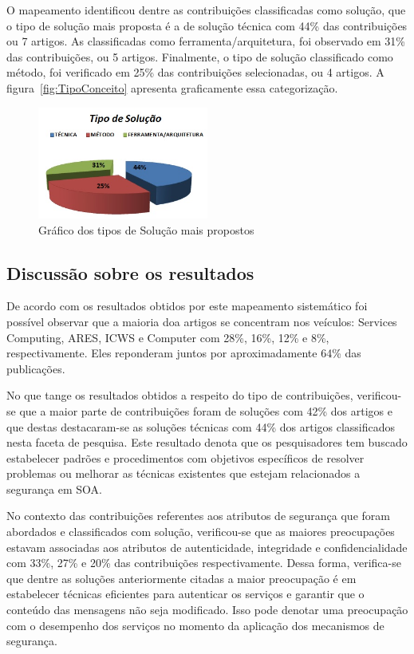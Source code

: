O mapeamento identificou dentre as contribuições classificadas como solução, que o tipo de solução mais proposta é a de solução técnica com 44\% das contribuições ou 7 artigos. As classificadas como ferramenta/arquitetura, foi observado em 31\% das contribuições, ou 5 artigos. Finalmente, o tipo de solução classificado como método, foi verificado em 25\% das contribuições selecionadas, ou 4 artigos. A figura~\ref{fig:TipoConceito} apresenta graficamente essa categorização.


\begin{figure}[!htb]
\centering
\includegraphics[width=0.5\textwidth]{tipo_solucao.jpg}
\caption{Gráfico dos tipos de Solução mais propostos}
\label{fig:tipo_solucao}
\end{figure}
\subsection{Discussão sobre os resultados}

De acordo com os resultados obtidos por este mapeamento sistemático foi possível observar que a maioria doa artigos se concentram nos veículos: Services Computing, ARES, ICWS e Computer com 28\%, 16\%, 12\% e 8\%, respectivamente. Eles reponderam juntos por aproximadamente 64\% das publicações.

No que tange os resultados obtidos a respeito do tipo de contribuições, verificou-se que a maior parte de contribuições foram de soluções com  42\% dos artigos e que destas destacaram-se as soluções técnicas com 44\% dos artigos classificados nesta faceta de pesquisa. Este resultado denota que os pesquisadores tem buscado estabelecer padrões e procedimentos  com objetivos específicos de resolver problemas ou melhorar as técnicas existentes que estejam  relacionados a segurança em SOA.

No contexto das contribuições referentes aos atributos de segurança que foram abordados e classificados com solução, verificou-se que as maiores preocupações estavam associadas aos atributos de  autenticidade, integridade e confidencialidade com 33\%, 27\% e 20\% das contribuições respectivamente. Dessa forma, verifica-se que dentre as soluções anteriormente citadas a maior preocupação é em estabelecer técnicas eficientes para autenticar os serviços e garantir que o conteúdo das mensagens não seja modificado. Isso pode denotar uma preocupação com o desempenho dos serviços no momento da aplicação dos mecanismos de segurança.
%

